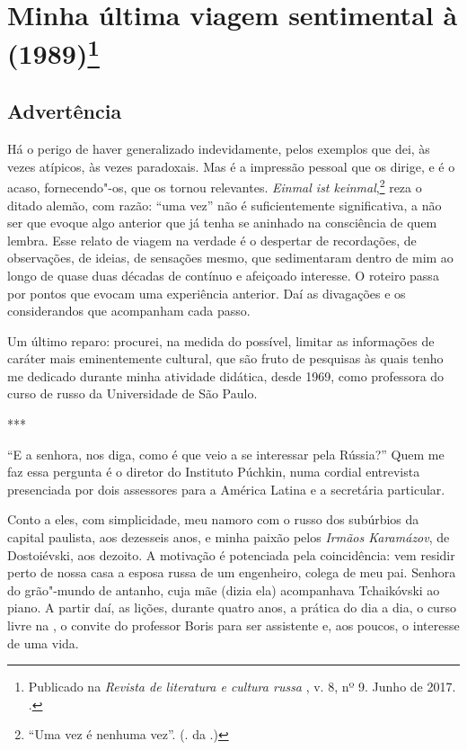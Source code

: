 \chapter{Minha última viagem sentimental à \protect{} (1989)\footnote{Publicado na \emph{Revista de literatura e cultura russa \protect{}}, v. 8, nº 9. Junho de 2017. \protect{}.}}
\label{urss}

\section{\uppercase{A}dvertência}

Há o perigo de haver generalizado indevidamente, pelos exemplos que dei, às vezes atípicos, às vezes paradoxais. Mas é a impressão pessoal que os dirige, e é o acaso, fornecendo"-os, que os tornou relevantes. \emph{Einmal ist keinmal},\footnote{``Uma vez é nenhuma vez''. (. da .)} reza o ditado alemão, com razão: ``uma vez'' não é suficientemente significativa, a não ser que evoque algo anterior que já tenha se aninhado na consciência de quem lembra. Esse relato de viagem na verdade é o despertar de recordações, de observações, de ideias, de sensações mesmo, que sedimentaram dentro de mim ao longo de quase duas décadas de contínuo e afeiçoado interesse. O roteiro passa por pontos que evocam uma experiência anterior. Daí as divagações e os considerandos que acompanham cada passo.

Um último reparo: procurei, na medida do possível, limitar as informações de caráter mais eminentemente cultural, que são fruto de pesquisas às quais tenho me dedicado durante minha atividade didática, desde 1969, como professora do curso de russo da Universidade de São Paulo.

\begin{center}
***
\end{center}

``E a senhora, nos diga, como é que veio a se interessar pela Rússia?'' Quem me faz essa pergunta é o diretor do Instituto Púchkin, numa cordial entrevista presenciada por dois assessores para a América Latina e a secretária particular.

Conto a eles, com simplicidade, meu namoro com o russo dos subúrbios da capital paulista, aos dezesseis anos, e minha paixão pelos \emph{Irmãos Karamázov}, de Dostoiévski, aos dezoito. A motivação é potenciada pela coincidência: vem residir perto de nossa casa a esposa russa de um engenheiro, colega de meu pai. Senhora do grão"-mundo de antanho, cuja mãe (dizia ela) acompanhava Tchaikóvski ao piano. A partir daí, as lições, durante quatro anos, a prática do dia a dia, o curso livre na , o convite do professor Boris para ser assistente e, aos poucos, o interesse de uma vida.

